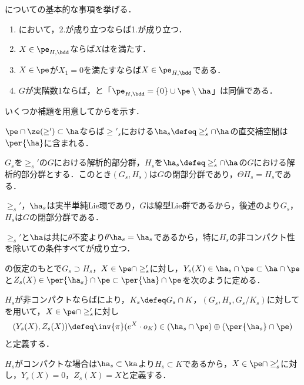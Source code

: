 についての基本的な事項を挙げる．

\begin{lem}\label{lem:basic-prob}
  \leavevmode\vspace{-1em}
  \begin{enumerate}[label=\textbf{\arabic*.}]
  \item {}において，2.が成り立つならば1.が成り立つ．
  \item $X\in \pe_{H,\bdd} $ならば$X$はを満たす．
  \item $X \in \pe $が$X_1 = 0$を満たすならば$X\in \pe_{H,\bdd} $である．
  \item $G$が実階数1ならば，と「$\pe_{H,\bdd} =  \{0\}\cup \pe\setminus\ha $」は同値である．
  \end{enumerate}
\end{lem}

いくつか補題を用意してからを示す．
\begin{lem}\label{lem:0117-perp}
  $\pe\cap \ze(\ge')\subset \ha $ならば$\ge'_s $における$\ha_s\defeq \ge_{s}'\cap\ha $の直交補空間は$\per{\ha} $に含まれる．
\end{lem}
\begin{npfwn}
  
\end{npfwn}

\begin{lem}\label{lem:0117-closed}
  $G_s $を$\ge_{s}' $の$G$における解析的部分群，$H_s $を$\ha_s\defeq \ge_{s}'\cap\ha $の$G$における解析的部分群とする．このとき$(G_s, H_s) $は$G$の閉部分群であり，$\Theta H_s = H_s $である．
\end{lem}
\begin{npfwn}
  $\ge_s' $，$\ha_s $は実半単純Lie環であり，$G$は線型Lie群であるから，後述のより$G_s$，$H_s$は$G$の閉部分群である．

  $\ge_{s}'$と$\ha $は共に$\theta$不変より$\theta \ha_s = \ha_s $であるから，特に$H_s$の非コンパクト性を除いての条件すべてが成り立つ．
\end{npfwn}

\begin{defi}

  の仮定のもとで$G_s\supset H_s$，$X\in \pe\cap\ge_{s}' $に対し，$Y_s(X)\in \ha_s\cap\pe \subset \ha\cap \pe $と$Z_s(X)\in \per{\ha_s}\cap \pe \subset \per{\ha}\cap \pe $を次のように定める．
  
  $H_s $が非コンパクトならばにより，$K_s\defeq G_s\cap K $，$(G_s, H_s, G_s/K_s) $に対してを用いて，$X\in \pe\cap\ge_{s}' $に対し
  \begin{align*}
    {(Y_s(X), Z_s(X))\defeq \inv{\pi}(e^X\cdot o_K)\in (\ha_s\cap\pe)\oplus (\per{\ha_s}\cap \pe)}
  \end{align*}
  と定義する．


  $H_s $がコンパクトな場合は$\ha_s\subset \ka $より$H_s\subset K $であるから，$X\in \pe\cap\ge_{s}' $に対し，$Y_s(X) = 0 $，$Z_s(X) = X $と定義する．
\end{defi}

